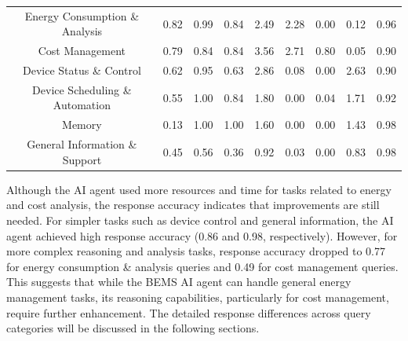 \documentclass[final,3p,times]{elsarticle}
\begin{document}
\begin{table}[ht]
{\begin{tabular}{ccccccccc}
Energy Consumption \& Analysis & 0.82 & 0.99 & 0.84 & 2.49 & 2.28 & 0.00 & 0.12 & 0.96 \\
Cost Management & 0.79 & 0.84 & 0.84 & 3.56 & 2.71 & 0.80 & 0.05 & 0.90 \\
Device Status \& Control & 0.62 & 0.95 & 0.63 & 2.86 & 0.08 & 0.00 & 2.63 & 0.90 \\
Device Scheduling \& Automation & 0.55 & 1.00 & 0.84 & 1.80 & 0.00 & 0.04 & 1.71 & 0.92 \\
Memory & 0.13 & 1.00 & 1.00 & 1.60 & 0.00 & 0.00 & 1.43 & 0.98 \\
General Information \& Support & 0.45 & 0.56 & 0.36 & 0.92 & 0.03 & 0.00 & 0.83 & 0.98 \\ \hline
\end{tabular}%
}
\end{table}


Although the AI agent used more resources and time for tasks related to energy and cost analysis, the response accuracy indicates that improvements are still needed. For simpler tasks such as device control and general information, the AI agent achieved high response accuracy (0.86 and 0.98, respectively). However, for more complex reasoning and analysis tasks, response accuracy dropped to 0.77 for energy consumption \& analysis queries and 0.49 for cost management queries. This suggests that while the BEMS AI agent can handle general energy management tasks, its reasoning capabilities, particularly for cost management, require further enhancement. The detailed response differences across query categories will be discussed in the following sections.
\end{document}
